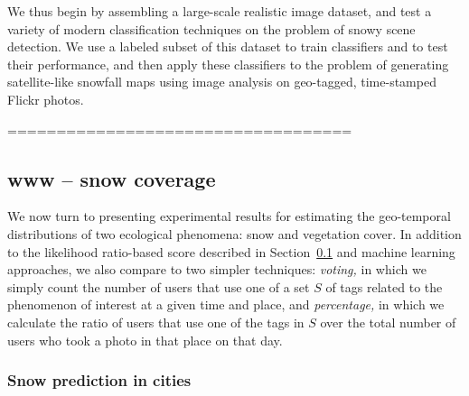 We thus begin by assembling a large-scale realistic image dataset,
and test a variety of modern classification techniques on the
problem of snowy scene detection. We use a labeled subset of this
dataset to train classifiers and to test their performance, and then
apply these classifiers to the problem of generating satellite-like
snowfall maps using image analysis on geo-tagged, time-stamped
Flickr photos.






\hfill \break
\hfill \break
===================================
\hfill \break
\hfill \break
\subsection{www -- snow coverage}

\label{sec:results}

We now turn to presenting experimental results for estimating the
geo-temporal distributions of two ecological phenomena: snow and vegetation cover.
In addition to the likelihood ratio-based score described in
Section~\ref{sec:results} and machine learning approaches, we also
compare to two simpler techniques: \textit{voting,} in which 
we simply count the number of users that use one of a set
$S$ of tags related to the phenomenon of interest at a given time and place, and
\textit{percentage,} in which we calculate the ratio of users that use
one of the tags in $S$ over the total number of users who took a photo
in that place on that day.

\subsubsection*{Snow prediction in cities}


